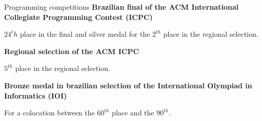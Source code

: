 \begin {rubric} {Programming competitions}
\entry*[2010]
\textbf{Brazilian final of the ACM International Collegiate Programming Contest
  (ICPC)}

$24^th$ place in the final and silver medal for the $2^{th}$ place in the
regional selection.

\entry*[2009]
\textbf{Regional selection of the ACM ICPC}

$5^{th}$ place in the regional selection.

\entry*[2003]
\textbf{Bronze medal in brazilian selection of the International Olympiad in
  Informatics (IOI)}

For a colocation between the $60^{th}$ place and the $90^{th}$.

\end{rubric}

